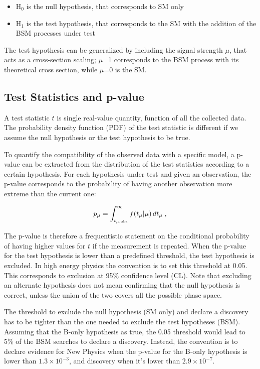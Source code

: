 \begin{itemize}
\item H$_0$ is the null hypothesis, that corresponds to SM only
\item H$_1$ is the test hypothesis, that corresponds to the SM with the addition of the BSM processes under test
\end{itemize}

\noindent The test hypothesis can be generalized by including the signal strength $\mu$, that acts as a cross-section scaling; $\mu$=1 corresponds to the BSM process with its theoretical cross section, while $\mu$=0 is the SM.

\subsection{Test Statistics and p-value}

 A test statistic $t$ is single real-value quantity, function of all the collected data. The probability density function (PDF) of the test statistic is different if we assume the null hypothesis or the test hypothesis to be true.

To quantify the compatibility of the observed data with a specific model, a p-value can be extracted from the distribution of the test statistics according to a certain hypothesis. For each hypothesis under test and given an observation, the p-value corresponds to the probability of having another observation more extreme than the current one:

\begin{equation}
\label{eq:stat:pval}
p_{\mu} = \int_{t_{\mu,{\rm obs}}}^{\infty} f(t_{\mu} | \mu ) \,
d t_{\mu} \;,
\end{equation}

The p-value is therefore a frequentistic statement on the conditional probability of having higher values for $t$ if the measurement is repeated. When the p-value for the test hypothesis is lower than a predefined threshold, the test hypothesis is excluded. In high energy physics the convention is to set this threshold at 0.05. This corresponds to exclusion at 95\% confidence level (CL). Note that excluding an alternate hypothesis does not mean confirming that the null hypothesis is correct, unless the union of the two covers all the possible phase space.

The threshold to exclude the null hypothesis (SM only) and declare a discovery has to be tighter than the one needed to exclude the test hypotheses (BSM). Assuming that the B-only hypothesis as true, the 0.05 threshold would lead to 5\% of the BSM searches to declare a discovery. Instead, the convention is to declare evidence for New Physics when the p-value for the B-only hypothesis is lower than $1.3 \times 10^{-3}$, and discovery when it's lower than $2.9 \times 10^{-7}$.

